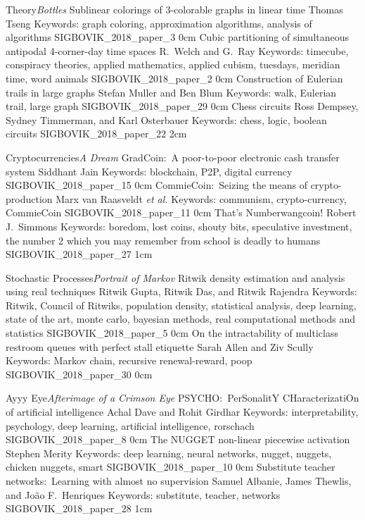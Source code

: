 
\addtrack
	{Theory}{\textit{Bottles}}
\addpaper
	{Sublinear colorings of 3-colorable graphs in linear time}
	{Thomas Tseng}
	{Keywords: graph coloring, approximation algorithms, analysis of algorithms}
	{SIGBOVIK_2018_paper_3}
	{0cm}
	{}
\addpaper
	{Cubic partitioning of simultaneous antipodal 4-corner-day time spaces}
	{R.\ Welch and G.\ Ray}
	{Keywords: timecube, conspiracy theories, applied mathematics, applied cubism, tuesdays, meridian time, word animals}
	{SIGBOVIK_2018_paper_2}
	{0cm}
	{}
\addpaper
	{Construction of Eulerian trails in large graphs}
	{Stefan Muller and Ben Blum}
	{Keywords: walk, Eulerian trail, large graph}
	{SIGBOVIK_2018_paper_29}
	{0cm}
	{}
\addpaper
	{Chess circuits}
	{Ross Dempsey, Sydney Timmerman, and Karl Osterbauer}
	{Keywords: chess, logic, boolean circuits}
	{SIGBOVIK_2018_paper_22}
	{2cm}
	{}

\addtrack
	{Cryptocurrencies}{\textit{A Dream}}
\addpaper
	{GradCoin:\ A poor-to-poor electronic cash transfer system}
	{Siddhant Jain}
	{Keywords: blockchain, P2P, digital currency}
	{SIGBOVIK_2018_paper_15}
	{0cm}
	{}
\addpaper
	{CommieCoin:\ Seizing the means of crypto-production}
	{Marx van Raasveldt \textit{et al.}}
	{Keywords: communism, crypto-currency, CommieCoin}
	{SIGBOVIK_2018_paper_11}
	{0cm}
	{}
\addpaper
	{That's Numberwangcoin!}
	{Robert J.\ Simmons}
	{Keywords: boredom, lost coins, shouty bits, speculative investment, the number 2 which you may remember from school is deadly to humans}
	{SIGBOVIK_2018_paper_27}
	{1cm}
	{}

\addtrack
	{Stochastic Processes}{\textit{Portrait of Markov}}
\addpaper
	{Ritwik density estimation and analysis using real techniques}
	{Ritwik Gupta, Ritwik Das, and Ritwik Rajendra}
	{Keywords: Ritwik, Council of Ritwiks, population density, statistical analysis, deep learning, state of the art, monte carlo, bayesian methods, real computational methods and statistics}
	{SIGBOVIK_2018_paper_5}
	{0cm}
	{}
\addpaper
	{On the intractability of multiclass restroom queues with perfect stall etiquette}
	{Sarah Allen and Ziv Scully}
	{Keywords: Markov chain, recursive renewal-reward, poop}
	{SIGBOVIK_2018_paper_30}
	{0cm}
	{}

\addtrack
	{Ayyy Eye}{\textit{Afterimage of a Crimson Eye}}
\addpaper
	{PSYCHO:\ PerSonalitY CHaracterizatiOn of artificial intelligence}
	{Achal Dave and Rohit Girdhar}
	{Keywords: interpretability, psychology, deep learning, artificial intelligence, rorschach}
	{SIGBOVIK_2018_paper_8}
	{0cm}
	{}
\addpaper
	{The NUGGET non-linear piecewise activation}
	{Stephen Merity}
	{Keywords: deep learning, neural networks, nugget, nuggets, chicken nuggets, smart}
	{SIGBOVIK_2018_paper_10}
	{0cm}
	{}
\addpaper
	{Substitute teacher networks:\ Learning with almost no supervision}
	{Samuel Albanie, James Thewlis, and Jo\~ao F.\ Henriques}
	{Keywords: substitute, teacher, networks}
	{SIGBOVIK_2018_paper_28}
	{1cm}
	{}

